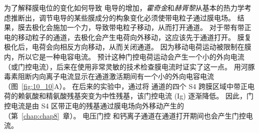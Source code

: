 为了解释膜电位的变化如何导致  电导的增加，\textit{霍奇金}和\textit{赫胥黎}从基本的热力学考虑推断出，调节电导的某些膜成分的构象变化必须使带电粒子通过膜电场。 
结果，膜去极化会施加一个力，导致带电粒子移动，从而打开通道。
对于带有带正电的移动粒子的通道，去极化会产生电荷向外移动，这应该先于通道打开。
膜复极化后，电荷会向相反方向移动，从而关闭通道。 
因为移动电荷运动被限制在膜内，所以它是一种电容电流。
预计这种门控电荷运动会产生一个小的外向电流（或门控电流），后来在使用非常灵敏的技术检查膜电流时证实了这一点。
用河豚毒素阻断内向离子电流显示在通道激活期间有一个小的外向电容电流（图~\ref{fig:10_10}A）。 
在后来的实验中，通过将  通道的四个 S4 跨膜区域中带正电荷的赖氨酸和精氨酸残基突变为中性残基，该门控电流 (Ig) 逐渐降低。 
因此，门控电流是由 S4 区带正电的残基通过膜电场向外移动产生的（第~\ref{chap:chap8}~章）。 
电压门控  和钙离子通道在通道打开期间也会产生门控电流。



